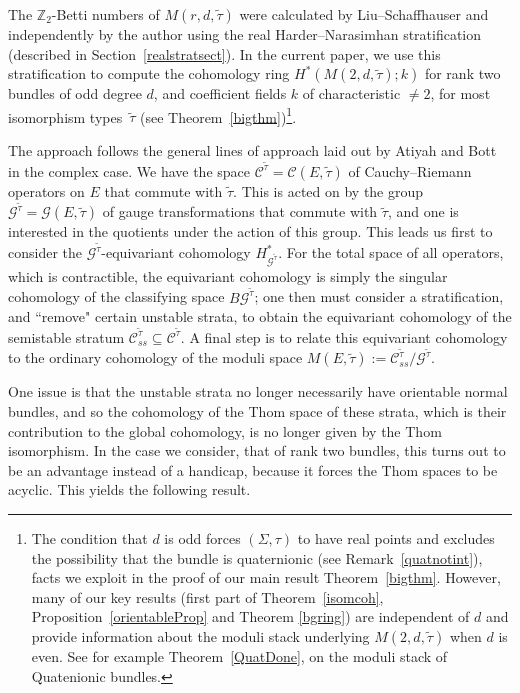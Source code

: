 \documentclass[pdftex]{sigma}
\numberwithin{equation}{section}
\begin{document}
The ${\mathbb Z}_2$-Betti numbers of $M(r,d,\tilde{\tau})$ were calculated by Liu--Schaf\/fhauser \cite{LS} and independently by the author \cite{B} using the real Harder--Narasimhan stratif\/ication (described in Section~\ref{realstratsect}). In the current paper, we use this stratif\/ication to compute the cohomology ring $H^*(M(2,d,\tilde{\tau}); k)$ for rank two bundles of odd degree $d$, and coef\/f\/icient f\/ields $k$ of characteristic $\neq 2$, for most isomorphism types~$\tilde{\tau}$ (see Theorem~\ref{bigthm})\footnote{The condition that $d$ is odd forces $(\Sigma, \tau)$ to have real points and excludes the possibility that the bundle is quaternionic (see Remark~\ref{quatnotint}), facts we exploit in the proof of our main result Theorem~\ref{bigthm}. However, many of our key results (f\/irst part of Theorem~\ref{isomcoh}, Proposition~\ref{orientableProp} and Theorem \ref{bgring}) are independent of $d$ and provide information about the moduli stack underlying $M(2,d,\tilde{\tau})$ when $d$ is even. See for example Theorem~\ref{QuatDone}, on the moduli stack of Quatenionic bundles.}.

The approach follows the general lines of approach laid out by Atiyah and Bott \cite{AB} in the complex case. We have the space ${\mathcal C}^{\tilde{\tau}} = {\mathcal C}(E,\tilde{\tau})$ of Cauchy--Riemann operators on $E$ that commute with $\tilde{\tau}$. This is acted on by the group ${\mathcal G}^{\tilde{\tau}} = {\mathcal G}(E,\tilde{\tau})$ of gauge transformations that commute with $\tilde{\tau}$, and one is interested in the quotients under the action of this group. This leads us f\/irst to consider the ${\mathcal G}^{\tilde{\tau}}$-equivariant cohomology $H^*_{{\mathcal G}^{\tilde{\tau}}}$. For the total space of all operators, which is contractible, the equivariant cohomology is simply the singular cohomology of the classifying space $B{\mathcal G}^{\tilde{\tau}}$; one then must consider a stratif\/ication, and ``remove" certain unstable strata, to obtain the equivariant cohomology of the semistable stratum ${\mathcal C}_{ss}^{\tilde{\tau}} \subseteq {\mathcal C}^{\tilde{\tau}}$. A f\/inal step is to relate this equivariant cohomology to the ordinary cohomology of the moduli space $M(E,\tilde{\tau}) := {\mathcal C}_{ss}^{\tilde{\tau}}/ {\mathcal G}^{\tilde{\tau}}$.

One issue is that the unstable strata no longer necessarily have orientable normal bundles, and so the cohomology of the Thom space of these strata, which is their contribution to the global cohomology, is no longer given by the Thom isomorphism. In the case we consider, that of rank two bundles, this turns out to be an advantage instead of a handicap, because it forces the Thom spaces to be acyclic. This yields the following result.
\end{document}
